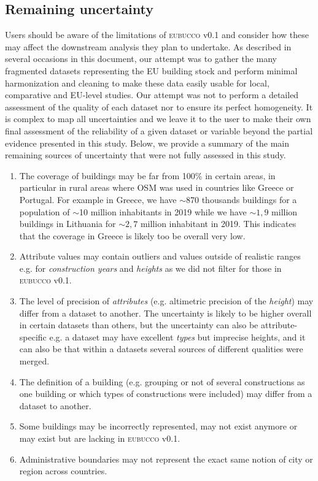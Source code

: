 \documentclass[fleqn,10pt]{wlscirep}
\begin{document}
\subsection*{Remaining uncertainty}
Users should be aware of the limitations of \textsc{eubucco} v0.1 and consider how these may affect the downstream analysis they plan to undertake. As described in several occasions in this document, our attempt was to gather the many fragmented datasets representing the EU building stock and perform minimal harmonization and cleaning to make these data easily usable for local, comparative and EU-level studies. Our attempt was not to perform a detailed assessment of the quality of each dataset nor to ensure its perfect homogeneity.
It is complex to map all uncertainties and we leave it to the user to make their own final assessment of the reliability of a given dataset or variable beyond the partial evidence presented in this study.
Below, we provide a summary of the main remaining sources of uncertainty that were not fully assessed in this study.  


\begin{enumerate}[topsep=0.2pt]
    \itemsep-0.15em 
    \item The coverage of buildings may be far from 100\% in certain areas, in particular in rural areas where OSM was used in countries like Greece or Portugal. For example in Greece, we have $\sim$870 thousands buildings for a population of $\sim$10 million inhabitants in 2019\cite{un19} while we have $\sim1,9$ million buildings in Lithuania for $\sim 2,7$ million inhabitant in 2019\cite{un19}. This indicates that the coverage in Greece is likely too be overall very low.
    \item Attribute values may contain outliers and values outside of realistic ranges e.g. for \textit{construction years} and \textit{heights} as we did not filter for those in \textsc{eubucco} v0.1.
    \item The level of precision of \textit{attributes} (e.g. altimetric precision of the \textit{height}) may differ from a dataset to another. The uncertainty is likely to be higher overall in certain datasets than others, but the uncertainty can also be attribute-specific e.g. a dataset may have excellent \textit{types} but imprecise heights, and it can also be that within a datasets several sources of different qualities were merged.
    \item The definition of a building (e.g. grouping or not of several constructions as one building or which types of constructions were included) may differ from a dataset to another.
    \item Some buildings may be incorrectly represented, may not exist anymore or may exist but are lacking in \textsc{eubucco} v0.1.
    \item Administrative boundaries may not represent the exact same notion of city or region across countries.  

\end{enumerate}
\end{document}
